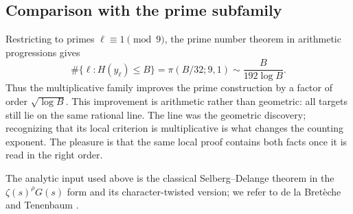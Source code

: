 \subsection{Comparison with the prime subfamily}

Restricting to primes \(\ell\equiv1\pmod9\), the prime number theorem in
arithmetic progressions gives
\[
 \#\{\ell:H(y_\ell)\le B\}
 =\pi(B/32;9,1)
 \sim\frac{B}{192\log B}.
 \tag{4.14}
\]
Thus the multiplicative family improves the prime construction by a factor
of order \(\sqrt{\log B}\).  This improvement is arithmetic rather than
geometric: all targets still lie on the same rational line.  The line was
the geometric discovery; recognizing that its local criterion is
multiplicative is what changes the counting exponent.  The pleasure is that
the same local proof contains both facts once it is read in the right order.

The analytic input used above is the classical Selberg--Delange theorem in
the \(\zeta(s)^\rho G(s)\) form and its character-twisted version; we refer
to de la Bret\`eche and Tenenbaum \cite{BretecheTenenbaum}.
